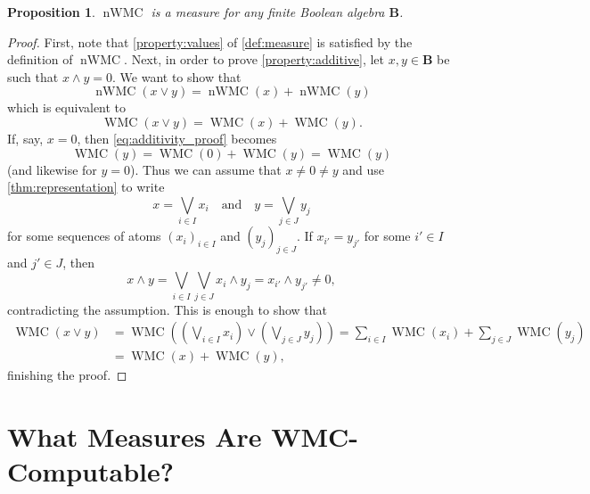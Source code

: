 \documentclass{article}
\newtheorem{proposition}{Proposition}
\theoremstyle{definition}
\theoremstyle{remark}
\DeclareMathOperator{\WMC}{WMC}
\DeclareMathOperator{\nWMC}{nWMC}
\begin{document}
\begin{proposition}
  $\nWMC$ is a measure for any finite Boolean algebra $\mathbf{B}$.
\end{proposition}
\begin{proof}
  First, note that \cref{property:values} of \cref{def:measure} is satisfied by
  the definition of $\nWMC$. Next, in order to prove \cref{property:additive},
  let $x, y \in \mathbf{B}$ be such that $x \land y = 0$. We want to show that
  \[
    \nWMC(x \lor y) = \nWMC(x) + \nWMC(y)
  \]
  which is equivalent to
  \begin{equation} \label{eq:additivity_proof}
    \WMC(x \lor y) = \WMC(x) + \WMC(y).
  \end{equation}
  If, say, $x = 0$, then \cref{eq:additivity_proof} becomes
  \[
    \WMC(y) = \WMC(0) + \WMC(y) = \WMC(y)
  \]
  (and likewise for $y = 0$). Thus we can assume that $x \ne 0 \ne y$ and use
  \cref{thm:representation} to write
  \[
    x = \bigvee_{i \in I} x_i \quad \text{and} \quad y = \bigvee_{j \in J} y_j
  \]
  for some sequences of atoms $(x_i)_{i \in I}$ and $(y_j)_{j \in J}$. If
  $x_{i'} = y_{j'}$ for some $i' \in I$ and $j' \in J$, then
  \[
    x \land y = \bigvee_{i \in I} \bigvee_{j \in J} x_i \land y_j = x_{i'} \land
    y_{j'} \ne 0,
  \]
  contradicting the assumption. This is enough to show that
  \begin{align*}
    \WMC(x \lor y) &= \WMC\left( \left( \bigvee_{i \in I} x_i \right) \lor \left(\bigvee_{j \in J} y_j \right) \right) = \sum_{i \in I} \WMC(x_i) + \sum_{j \in J} \WMC(y_j) \\
                   &= \WMC(x) + \WMC(y),
  \end{align*}
  finishing the proof.
\end{proof}


\section{What Measures Are WMC-Computable?}
\end{document}

